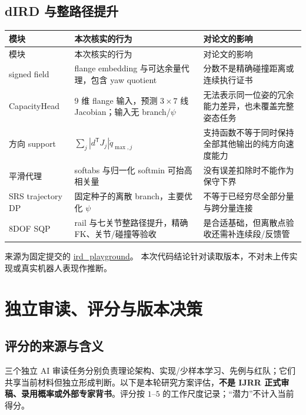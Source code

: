 \documentclass[11pt,a4paper]{article}
\theoremstyle{cn}
\begin{document}
\subsection{dIRD 与整路径提升}

\small
\begin{longtable}{@{}p{.22\linewidth}p{.34\linewidth}p{.36\linewidth}@{}}
\toprule
模块 & 本次核实的行为 & 对论文的影响\\
\midrule
\endfirsthead
\toprule 模块 & 本次核实的行为 & 对论文的影响\\\midrule
\endhead
signed field & flange embedding 与可达余量代理，包含 yaw quotient & 分数不是精确碰撞距离或连续执行证书\\
CapacityHead & 9 维 flange 输入，预测 \(3\times7\) 线 Jacobian；输入无 branch/\(\psi\) & 无法表示同一位姿的冗余能力差异，也未覆盖完整姿态任务\\
方向 support & \(\sum_j|d^{\mathsf T}J_j|\dot q_{\max,j}\) & 支持函数不等于同时保持全部其他输出的纯方向速度能力\\
平滑代理 & softabs 与归一化 softmin 可抬高相关量 & 没有误差扣除时不能作为保守下界\\
SRS trajectory DP & 固定种子的离散 branch，主要优化 \(\psi\) & 不等于已经穷尽全部分量与跨分量连接\\
8DOF SQP & rail 与七关节整路径提升，精确 FK、关节/碰撞等验收 & 是合适基础，但离散点验收还需补连续段/反馈管\\
\bottomrule
\end{longtable}
\normalsize

来源为固定提交的
\href{https://github.com/NingMeng0903/RealUS_playground/tree/088d4b05d961749639803c32d1131aa239ee7408/ird_playground}{ird\_playground}。
本次代码结论针对读取版本，不对未上传实现或真实机器人表现作推断。

\clearpage
\section{独立审读、评分与版本决策}
\label{app:review}

\subsection{评分的来源与含义}

三个独立 AI 审读任务分别负责理论架构、实现/少样本学习、先例与红队；它们共享当前材料但独立形成判断。以下是本轮研究方案评估，\textbf{不是 IJRR 正式审稿、录用概率或外部专家背书}。评分按 \(1\)--\(5\) 的工作尺度记录；“潜力”不计入当前得分。
\end{document}

